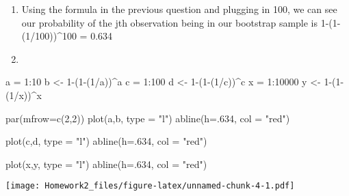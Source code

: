 \documentclass[
]{article}
\newenvironment{Shaded}{\begin{snugshade}}{\end{snugshade}}
\newcommand{\AttributeTok}[1]{\textcolor[rgb]{0.77,0.63,0.00}{#1}}
\newcommand{\DecValTok}[1]{\textcolor[rgb]{0.00,0.00,0.81}{#1}}
\newcommand{\FunctionTok}[1]{\textcolor[rgb]{0.00,0.00,0.00}{#1}}
\newcommand{\NormalTok}[1]{#1}
\newcommand{\OtherTok}[1]{\textcolor[rgb]{0.56,0.35,0.01}{#1}}
\newcommand{\SpecialCharTok}[1]{\textcolor[rgb]{0.00,0.00,0.00}{#1}}
\newcommand{\StringTok}[1]{\textcolor[rgb]{0.31,0.60,0.02}{#1}}
\begin{document}
\begin{enumerate}
\def\labelenumi{\alph{enumi})}
\setcounter{enumi}{4}
\item
  Using the formula in the previous question and plugging in 100, we can
  see our probability of the jth observation being in our bootstrap
  sample is 1-(1-(1/100))\^{}100 = 0.634
\item
\end{enumerate}

\begin{Shaded}
\begin{Highlighting}[]
\NormalTok{a }\OtherTok{=} \DecValTok{1}\SpecialCharTok{:}\DecValTok{10}
\NormalTok{b }\OtherTok{\textless{}{-}} \DecValTok{1}\SpecialCharTok{{-}}\NormalTok{(}\DecValTok{1}\SpecialCharTok{{-}}\NormalTok{(}\DecValTok{1}\SpecialCharTok{/}\NormalTok{a))}\SpecialCharTok{\^{}}\NormalTok{a}
\NormalTok{c }\OtherTok{=} \DecValTok{1}\SpecialCharTok{:}\DecValTok{100}
\NormalTok{d }\OtherTok{\textless{}{-}} \DecValTok{1}\SpecialCharTok{{-}}\NormalTok{(}\DecValTok{1}\SpecialCharTok{{-}}\NormalTok{(}\DecValTok{1}\SpecialCharTok{/}\NormalTok{c))}\SpecialCharTok{\^{}}\NormalTok{c}
\NormalTok{x }\OtherTok{=} \DecValTok{1}\SpecialCharTok{:}\DecValTok{10000}
\NormalTok{y }\OtherTok{\textless{}{-}} \DecValTok{1}\SpecialCharTok{{-}}\NormalTok{(}\DecValTok{1}\SpecialCharTok{{-}}\NormalTok{(}\DecValTok{1}\SpecialCharTok{/}\NormalTok{x))}\SpecialCharTok{\^{}}\NormalTok{x}


\FunctionTok{par}\NormalTok{(}\AttributeTok{mfrow=}\FunctionTok{c}\NormalTok{(}\DecValTok{2}\NormalTok{,}\DecValTok{2}\NormalTok{))}
\FunctionTok{plot}\NormalTok{(a,b, }\AttributeTok{type =} \StringTok{"l"}\NormalTok{)}
\FunctionTok{abline}\NormalTok{(}\AttributeTok{h=}\NormalTok{.}\DecValTok{634}\NormalTok{, }\AttributeTok{col =} \StringTok{"red"}\NormalTok{)}

\FunctionTok{plot}\NormalTok{(c,d, }\AttributeTok{type =} \StringTok{"l"}\NormalTok{)}
\FunctionTok{abline}\NormalTok{(}\AttributeTok{h=}\NormalTok{.}\DecValTok{634}\NormalTok{, }\AttributeTok{col =} \StringTok{"red"}\NormalTok{)}

\FunctionTok{plot}\NormalTok{(x,y, }\AttributeTok{type =} \StringTok{"l"}\NormalTok{)}
\FunctionTok{abline}\NormalTok{(}\AttributeTok{h=}\NormalTok{.}\DecValTok{634}\NormalTok{, }\AttributeTok{col =} \StringTok{"red"}\NormalTok{)}
\end{Highlighting}
\end{Shaded}

\texttt{[image: Homework2\_files/figure-latex/unnamed-chunk-4-1.pdf]}
\end{document}
